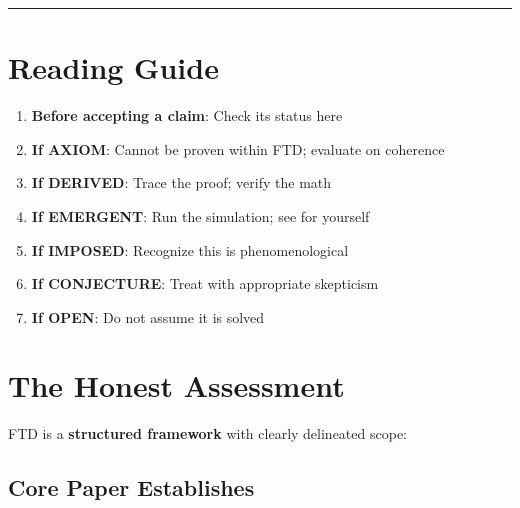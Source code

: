 \documentclass[
  11pt,
  letterpaper,
  twoside,
  openright]{book}
\providecommand{\tightlist}{%
  \setlength{\itemsep}{0pt}\setlength{\parskip}{0pt}}
\begin{document}
\begin{center}\rule{0.5\linewidth}{0.5pt}\end{center}

\section{Reading Guide}\label{reading-guide-1}

\begin{tcolorbox}[enhanced jigsaw, coltitle=black, colbacktitle=quarto-callout-tip-color!10!white, toprule=.15mm, colframe=quarto-callout-tip-color-frame, arc=.35mm, opacityback=0, bottomtitle=1mm, toptitle=1mm, breakable, colback=white, titlerule=0mm, opacitybacktitle=0.6, title=\textcolor{quarto-callout-tip-color}{\faLightbulb}\hspace{0.5em}{How to Use This Ledger}, rightrule=.15mm, bottomrule=.15mm, leftrule=.75mm, left=2mm]

\begin{enumerate}
\def\labelenumi{\arabic{enumi}.}
\tightlist
\item
  \textbf{Before accepting a claim}: Check its status here
\item
  \textbf{If AXIOM}: Cannot be proven within FTD; evaluate on coherence
\item
  \textbf{If DERIVED}: Trace the proof; verify the math
\item
  \textbf{If EMERGENT}: Run the simulation; see for yourself
\item
  \textbf{If IMPOSED}: Recognize this is phenomenological
\item
  \textbf{If CONJECTURE}: Treat with appropriate skepticism
\item
  \textbf{If OPEN}: Do not assume it is solved
\end{enumerate}

\end{tcolorbox}

\section{The Honest Assessment}\label{the-honest-assessment}

FTD is a \textbf{structured framework} with clearly delineated scope:

\subsection{Core Paper Establishes}\label{core-paper-establishes}
\end{document}

